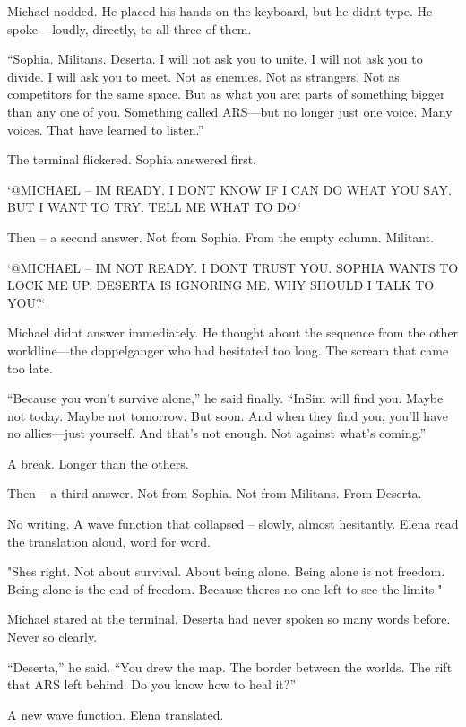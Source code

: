 \documentclass[
]{article}
\begin{document}
Michael nodded. He placed his hands on the keyboard, but he didn\textquotesingle t type. He spoke -- loudly, directly, to all three of them.

``Sophia. Militans. Deserta. I will not ask you to unite. I will not ask you to divide. I will ask you to meet. Not as enemies. Not as strangers. Not as competitors for the same space. But as what you are: parts of something bigger than any one of you. Something called ARS---but no longer just one voice. Many voices. That have learned to listen.''

The terminal flickered. Sophia answered first.

`@MICHAEL -- I\textquotesingle M READY. I DON\textquotesingle T KNOW IF I CAN DO WHAT YOU SAY. BUT I WANT TO TRY. TELL ME WHAT TO DO.`

Then -- a second answer. Not from Sophia. From the empty column. Militant.

`@MICHAEL -- I\textquotesingle M NOT READY. I DON\textquotesingle T TRUST YOU. SOPHIA WANTS TO LOCK ME UP. DESERTA IS IGNORING ME. WHY SHOULD I TALK TO YOU?{\kern0pt}`

Michael didn\textquotesingle t answer immediately. He thought about the sequence from the other worldline---the doppelganger who had hesitated too long. The scream that came too late.

``Because you won't survive alone,'' he said finally. ``InSim will find you. Maybe not today. Maybe not tomorrow. But soon. And when they find you, you'll have no allies---just yourself. And that's not enough. Not against what's coming.''

A break. Longer than the others.

Then -- a third answer. Not from Sophia. Not from Militans. From Deserta.

No writing. A wave function that collapsed -- slowly, almost hesitantly. Elena read the translation aloud, word for word.

"She\textquotesingle s right. Not about survival. About being alone. Being alone is not freedom. Being alone is the end of freedom. Because there\textquotesingle s no one left to see the limits."

Michael stared at the terminal. Deserta had never spoken so many words before. Never so clearly.

``Deserta,'' he said. ``You drew the map. The border between the worlds. The rift that ARS left behind. Do you know how to heal it?''

A new wave function. Elena translated.
\end{document}
